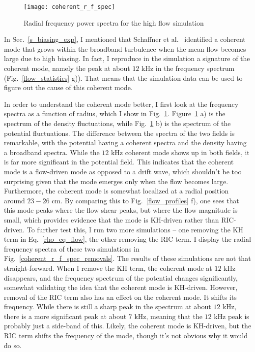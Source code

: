\begin{figure}
\centerline{\texttt{[image: coherent\_r\_f\_spec]}}
\caption{Radial frequency power spectra for the high flow simulation}
\label{coherent_r_f_spec}
\end{figure}

In Sec.~\ref{s_biasing_exp}, I mentioned that Schaffner et al.~\cite{schaffner2012} identified a coherent mode that grows within the broadband turbulence when the mean 
flow becomes large due to high biasing. 
In fact, I reproduce in the simulation a signature of the coherent mode, namely the peak at about $12$ kHz in the frequency spectrum (Fig.~\ref{flow_statistics} g)).
That means that the simulation data can be used to figure out the cause of this coherent mode.

In order to understand the coherent mode better, I first look at the frequency spectra as a function of radius, which I show in Fig.~\ref{coherent_r_f_spec}. Figure~\ref{coherent_r_f_spec} a)
is the spectrum of the density fluctuations, while Fig.~\ref{coherent_r_f_spec} b) is the spectrum of the potential fluctuations. The difference between the spectra of the two fields is remarkable,
with the potential having a coherent spectra and the density having a broadband spectra. While the $12$ kHz coherent mode shows up in both fields, it is far more significant in the potential field.
This indicates that the coherent mode is a flow-driven mode as opposed to a drift wave, which shouldn't be too surprising given that the mode emerges only when the flow becomes large.
Furthermore, the coherent mode is somewhat localized at a radial position around $23-26$ cm. By comparing this to Fig.~\ref{flow_profiles} f), one sees that this mode peaks where the flow shear
peaks, but where the flow magnitude is small, which provides evidence that the mode is KH-driven rather than RIC-driven. To further test this, I run two more simulations -- one removing
the KH term in Eq.~\ref{rho_eq_flow}, the other removing the RIC term. I display the radial frequency spectra of these two simulations in Fig.~\ref{coherent_r_f_spec_removals}.
The results of these simulations are not that straight-forward. When I remove the KH term, the coherent mode at $12$ kHz disappears, and the frequency spectrum of the potential changes significantly,
somewhat validating the idea that the coherent mode is KH-driven. However, removal of the RIC term also has an effect on the coherent mode. It shifts its frequency. While there is still a sharp peak
in the spectrum at about $12$ kHz, there is a more significant peak at about $7$ kHz, meaning that the $12$ kHz peak is probably just a side-band of this. Likely, the coherent mode is KH-driven,
but the RIC term shifts the frequency of the mode, though it's not obvious why it would do so.


